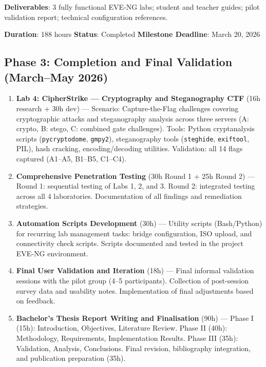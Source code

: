 \textbf{Deliverables}: 3 fully functional EVE-NG labs; student and teacher guides;
pilot validation report; technical configuration references.

\textbf{Duration}: 188 hours \quad \textbf{Status}: Completed \quad
\textbf{Milestone Deadline}: March 20, 2026

\subsection{Phase 3: Completion and Final Validation (March--May 2026)}

\begin{enumerate}

\item \textbf{Lab 4: CipherStrike --- Cryptography and Steganography CTF} (16h research + 30h dev) ---
Scenario: Capture-the-Flag challenges covering cryptographic attacks and steganography
analysis across three servers (A: crypto, B: stego, C: combined gate challenges).
Tools: Python cryptanalysis scripts (\texttt{pycryptodome}, \texttt{gmpy2}), steganography tools (\texttt{steghide}, \texttt{exiftool}, PIL), hash cracking, encoding/decoding utilities.
Validation: all 14 flags captured (A1--A5, B1--B5, C1--C4).

\item \textbf{Comprehensive Penetration Testing} (30h Round 1 + 25h Round 2) ---
Round 1: sequential testing of Labs 1, 2, and 3.
Round 2: integrated testing across all 4 laboratories.
Documentation of all findings and remediation strategies.

\item \textbf{Automation Scripts Development} (30h) ---
Utility scripts (Bash/Python) for recurring lab management tasks:
bridge configuration, ISO upload, and connectivity check scripts.
Scripts documented and tested in the project EVE-NG environment.

\item \textbf{Final User Validation and Iteration} (18h) ---
Final informal validation sessions with the pilot group (4--5 participants).
Collection of post-session survey data and usability notes.
Implementation of final adjustments based on feedback.

\item \textbf{Bachelor's Thesis Report Writing and Finalisation} (90h) ---
Phase I (15h): Introduction, Objectives, Literature Review.
Phase II (40h): Methodology, Requirements, Implementation Results.
Phase III (35h): Validation, Analysis, Conclusions.
Final revision, bibliography integration, and publication preparation (35h).

\end{enumerate}

